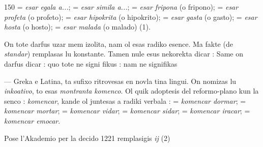 \begin{VUpage}[154]{150}
\VUcontinue
{} = \textit{esar egala a...};  = \textit{esar simila a...}; \nl
= \textit{esar fripona} (o fripono);  = \textit{esar profeta} (o\nl
profeto);  = \textit{esar hipokrita} (o hipokrito); \nl
= \textit{esar gasta} (o gasto);  = \textit{esar hosta} (o hosto); \cc
{} = \textit{esar malada} (o malado) (1).

On tote darfus uzar  mem izolita, nam ol esas radiko\nl
esence. Ma fakte  (de \textit{standar}) remplasas lu konstante.\nl
Tamen nule esus nekorekta dicar : \nl
Same on darfus dicar :  quo tote ne signi\cc
fikus :  nam  ne signifikas 

 --- Greka e Latina, ta sufixo ritrovesas en novla\cc
tina lingui. On nomizas lu \textit{inkoativo}, to esas \textit{montranta}\nl
\textit{komenco}. Ol quik adoptesis del reformo-plano kun la senco :\nl
\textit{komencar}, kande ol juntesas a radiki verbala :  =\nl
\textit{komencar dormar};  = \textit{komencar mortar}; \nl
= \textit{komencar vidar};  = \textit{komencar sidar};  =\nl
\textit{komencar iracar};  = \textit{komencar emocar}.

Pose l'Akademio per la decido 1221 remplasigis \textit{ij} (2)\parplein
\end{VUpage}

